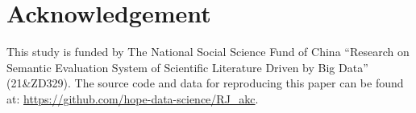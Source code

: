 \hypertarget{acknowledgement}{%
\section{Acknowledgement}\label{acknowledgement}}

This study is funded by The National Social Science Fund of China
``Research on Semantic Evaluation System of Scientific Literature Driven
by Big Data'' (21\&ZD329). The source code and data for reproducing this
paper can be found at:
\url{https://github.com/hope-data-science/RJ_akc}.



\address{%
Tian-Yuan Huang\\
National Science Library, Chinese Academy of Sciences\\%
Beijing, China\\
%
%
\textit{ORCiD: \href{https://orcid.org/0000-0002-4151-3764}{0000-0002-4151-3764}}\\%
\href{mailto:huangtianyuan@mail.las.ac.cn}{\nolinkurl{huangtianyuan@mail.las.ac.cn}}%
}

\address{%
Li Li\\
National Science Library, Chinese Academy of Sciences; Department of
Library, Information and Archives Management, School of Economics and
Management, University of Chinese Academy of Science\\%
Beijing, China\\
%
%
%
\href{mailto:lili2020@mail.las.ac.cn}{\nolinkurl{lili2020@mail.las.ac.cn}}%
}

\address{%
Liying Yang\\
National Science Library, Chinese Academy of Sciences\\%
Beijing, China\\
%
%
%
\href{mailto:yangly@mail.las.ac.cn}{\nolinkurl{yangly@mail.las.ac.cn}}%
}
